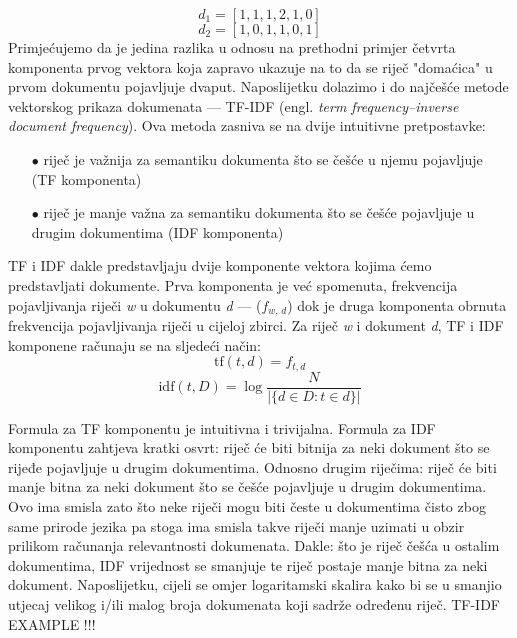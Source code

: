 \documentclass[times, utf8, zavrsni]{fer}
\begin{document}
\begin{equation}
{{d_{1}}=[1, 1, 1, 2, 1, 0]}
\end{equation}
\begin{equation}
{{d_{2}}=[1, 0, 1, 1, 0, 1]}
\end{equation}
Primjećujemo da je jedina razlika u odnosu na prethodni primjer četvrta komponenta prvog vektora koja zapravo ukazuje na to da se riječ "domaćica" u prvom dokumentu pojavljuje dvaput.
Naposlijetku dolazimo i do najčešće metode vektorskog prikaza dokumenata — TF-IDF (engl. \textit{term frequency–inverse document frequency}). Ova metoda zasniva se na dvije intuitivne pretpostavke:
\begin{itemize}
\item[$\bullet$] riječ je važnija za semantiku dokumenta što se češće u njemu pojavljuje (TF komponenta)
\item[$\bullet$] riječ je manje važna za semantiku dokumenta što se češće pojavljuje u drugim dokumentima (IDF komponenta)
\end{itemize}
TF i IDF dakle predstavljaju dvije komponente vektora kojima ćemo predstavljati dokumente. Prva komponenta je već spomenuta, frekvencija pojavljivanja riječi \textit{w} u dokumentu \textit{d} — ($f_\textit{w, d}$) dok je druga komponenta obrnuta frekvencija pojavljivanja riječi u cijeloj zbirci.
Za riječ \textit{w} i dokument \textit{d}, TF i IDF komponene računaju se na sljedeći način:
\begin{equation}
{\displaystyle \mathrm {tf} (t,d)=f_{t,d}}
\end{equation}
\begin{equation}
{\displaystyle \mathrm {idf} (t,D)=\log {\frac {N}{|\{d\in D:t\in d\}|}}}
\end{equation}

Formula za TF komponentu je intuitivna i trivijalna. Formula za IDF komponentu zahtjeva kratki osvrt: riječ će biti bitnija za neki dokument što se rijeđe pojavljuje u drugim dokumentima. Odnosno drugim riječima: riječ će biti manje bitna za neki dokument što se češće pojavljuje u drugim dokumentima. Ovo ima smisla zato što neke riječi mogu biti česte u dokumentima čisto zbog same prirode jezika pa stoga ima smisla takve riječi manje uzimati u obzir prilikom računanja relevantnosti dokumenata. Dakle: što je riječ češća u ostalim dokumentima, IDF vrijednost se smanjuje te riječ postaje manje bitna za neki dokument. Naposlijetku, cijeli se omjer logaritamski skalira kako bi se u smanjio utjecaj velikog i/ili malog broja dokumenata koji sadrže određenu riječ.
TF-IDF EXAMPLE !!!
\end{document}
